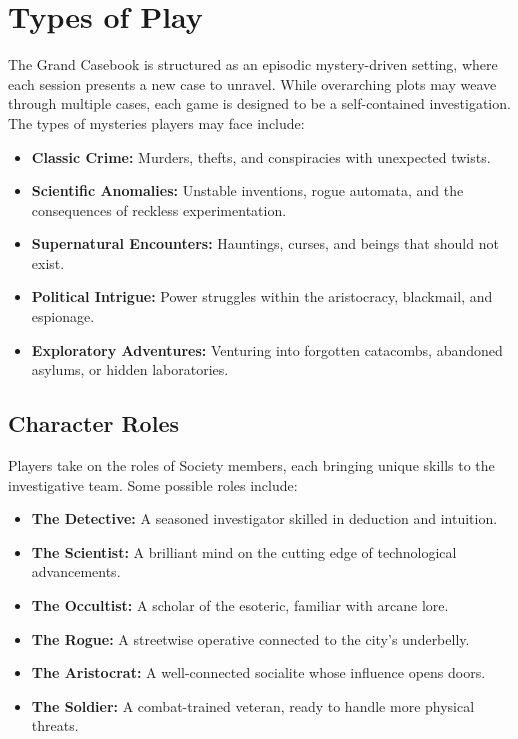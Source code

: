 \section{Types of Play}

The Grand Casebook is structured as an episodic mystery-driven setting, where each session presents a new case to unravel. While overarching plots may weave through multiple cases, each game is designed to be a self-contained investigation. The types of mysteries players may face include:

\begin{itemize}
    \item \textbf{Classic Crime:} Murders, thefts, and conspiracies with unexpected twists.
    \item \textbf{Scientific Anomalies:} Unstable inventions, rogue automata, and the consequences of reckless experimentation.
    \item \textbf{Supernatural Encounters:} Hauntings, curses, and beings that should not exist.
    \item \textbf{Political Intrigue:} Power struggles within the aristocracy, blackmail, and espionage.
    \item \textbf{Exploratory Adventures:} Venturing into forgotten catacombs, abandoned asylums, or hidden laboratories.
\end{itemize}

\subsection{Character Roles}

Players take on the roles of Society members, each bringing unique skills to the investigative team. Some possible roles include:

\begin{itemize}
    \item \textbf{The Detective:} A seasoned investigator skilled in deduction and intuition.
    \item \textbf{The Scientist:} A brilliant mind on the cutting edge of technological advancements.
    \item \textbf{The Occultist:} A scholar of the esoteric, familiar with arcane lore.
    \item \textbf{The Rogue:} A streetwise operative connected to the city’s underbelly.
    \item \textbf{The Aristocrat:} A well-connected socialite whose influence opens doors.
    \item \textbf{The Soldier:} A combat-trained veteran, ready to handle more physical threats.
\end{itemize}

